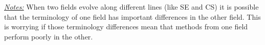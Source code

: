 \documentclass[sigconf,review,anonymous]{acmart}
\begin{document}
\noindent \textit{\underline{Notes:}} When two fields evolve along different
lines (like SE and CS) it is possible that the terminology of one field has important
differences in the other field. This is worrying if those terminology differences mean that methods from one field perform poorly in the other.

\end{document}

